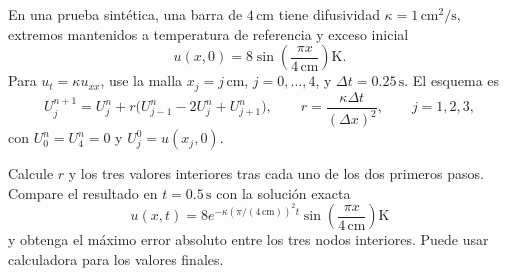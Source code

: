 En una prueba sintética, una barra de \(4\,\mathrm{cm}\) tiene difusividad \(\kappa=1\,\mathrm{cm^2/s}\), extremos mantenidos a temperatura de referencia y exceso inicial
\[
u(x,0)=8\sin\left(\frac{\pi x}{4\,\mathrm{cm}}\right)\mathrm K.
\]
Para \(u_t=\kappa u_{xx}\), use la malla \(x_j=j\,\mathrm{cm}\), \(j=0,\ldots,4\), y \(\Delta t=0.25\,\mathrm s\). El esquema es
\[
U_j^{n+1}=U_j^n+r\bigl(U_{j-1}^n-2U_j^n+U_{j+1}^n\bigr),
\qquad r=\frac{\kappa\Delta t}{(\Delta x)^2},\qquad j=1,2,3,
\]
con \(U_0^n=U_4^n=0\) y \(U_j^0=u(x_j,0)\).

Calcule \(r\) y los tres valores interiores tras cada uno de los dos primeros pasos. Compare el resultado en \(t=0.5\,\mathrm s\) con la solución exacta
\[
u(x,t)=8e^{-\kappa(\pi/(4\,\mathrm{cm}))^2t}
\sin\left(\frac{\pi x}{4\,\mathrm{cm}}\right)\mathrm K
\]
y obtenga el máximo error absoluto entre los tres nodos interiores. Puede usar calculadora para los valores finales.
